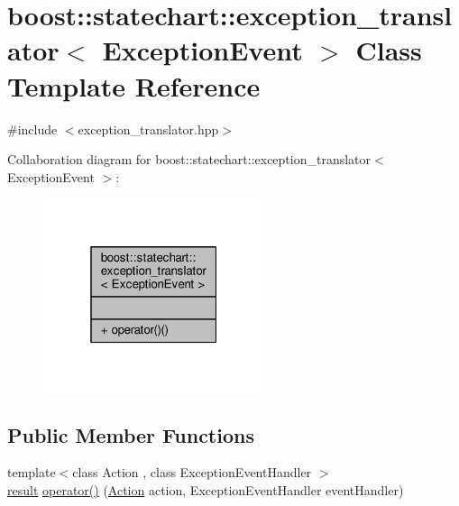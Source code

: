 \hypertarget{classboost_1_1statechart_1_1exception__translator}{}\section{boost\+:\+:statechart\+:\+:exception\+\_\+translator$<$ Exception\+Event $>$ Class Template Reference}
\label{classboost_1_1statechart_1_1exception__translator}


{\ttfamily \#include $<$exception\+\_\+translator.\+hpp$>$}



Collaboration diagram for boost\+:\+:statechart\+:\+:exception\+\_\+translator$<$ Exception\+Event $>$\+:
\nopagebreak
\begin{figure}[H]
\begin{center}
\leavevmode
\includegraphics[width=184pt]{classboost_1_1statechart_1_1exception__translator__coll__graph}
\end{center}
\end{figure}
\subsection*{Public Member Functions}
\begin{DoxyCompactItemize}
\item 
{\footnotesize template$<$class Action , class Exception\+Event\+Handler $>$ }\\\mbox{\hyperlink{namespaceboost_1_1statechart_abe807f6598b614d6d87bb951ecd92331}{result}} \mbox{\hyperlink{classboost_1_1statechart_1_1exception__translator_a63746f3c872bed0ac70524977ea8644f}{operator()}} (\mbox{\hyperlink{_transition_test_8cpp_a0702b01a6272fb248401c96dd3528cec}{Action}} action, Exception\+Event\+Handler event\+Handler)
\end{DoxyCompactItemize}


